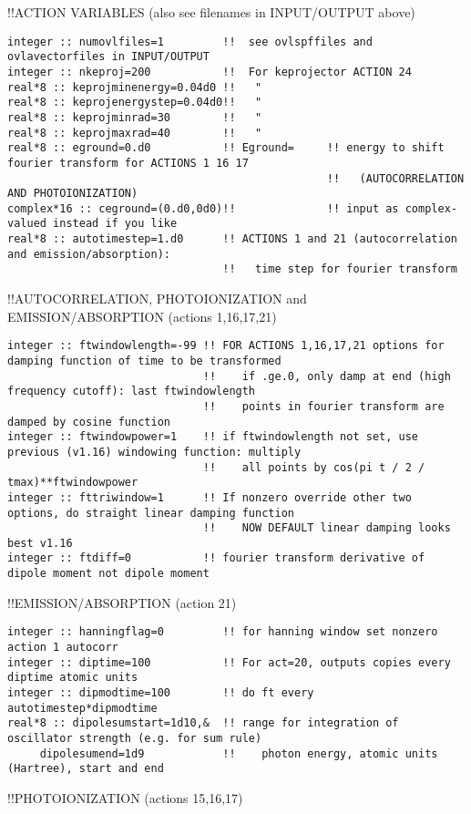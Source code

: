 !!{\large \quad ACTION VARIABLES (also see filenames in INPUT/OUTPUT above)}
\begin{verbatim}
integer :: numovlfiles=1         !!  see ovlspffiles and ovlavectorfiles in INPUT/OUTPUT
integer :: nkeproj=200           !!  For keprojector ACTION 24
real*8 :: keprojminenergy=0.04d0 !!   "
real*8 :: keprojenergystep=0.04d0!!   "
real*8 :: keprojminrad=30        !!   "
real*8 :: keprojmaxrad=40        !!   "
real*8 :: eground=0.d0           !! Eground=     !! energy to shift fourier transform for ACTIONS 1 16 17
                                                 !!   (AUTOCORRELATION AND PHOTOIONIZATION)
complex*16 :: ceground=(0.d0,0d0)!!              !! input as complex-valued instead if you like
real*8 :: autotimestep=1.d0      !! ACTIONS 1 and 21 (autocorrelation and emission/absorption):
                                 !!   time step for fourier transform
\end{verbatim}
!!{\large \quad AUTOCORRELATION, PHOTOIONIZATION and EMISSION/ABSORPTION (actions 1,16,17,21)}
\begin{verbatim}
integer :: ftwindowlength=-99 !! FOR ACTIONS 1,16,17,21 options for damping function of time to be transformed
                              !!    if .ge.0, only damp at end (high frequency cutoff): last ftwindowlength 
                              !!    points in fourier transform are damped by cosine function
integer :: ftwindowpower=1    !! if ftwindowlength not set, use previous (v1.16) windowing function: multiply
                              !!    all points by cos(pi t / 2 / tmax)**ftwindowpower 
integer :: fttriwindow=1      !! If nonzero override other two options, do straight linear damping function
                              !!    NOW DEFAULT linear damping looks best v1.16
integer :: ftdiff=0           !! fourier transform derivative of dipole moment not dipole moment
\end{verbatim}
!!{\large \quad EMISSION/ABSORPTION (action 21)}
\begin{verbatim}
integer :: hanningflag=0         !! for hanning window set nonzero action 1 autocorr
integer :: diptime=100           !! For act=20, outputs copies every diptime atomic units
integer :: dipmodtime=100        !! do ft every autotimestep*dipmodtime
real*8 :: dipolesumstart=1d10,&  !! range for integration of oscillator strength (e.g. for sum rule)
     dipolesumend=1d9            !!    photon energy, atomic units (Hartree), start and end
\end{verbatim}
!!{\large \quad PHOTOIONIZATION (actions 15,16,17)}
